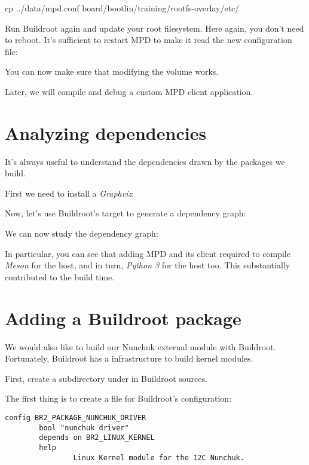\begin{bashinput}
cp ../data/mpd.conf board/bootlin/training/rootfs-overlay/etc/
\end{bashinput}

Run Buildroot again and update your root filesystem. Here again, you
don't need to reboot. It's sufficient to restart MPD to make it read
the new configuration file:


You can now make sure that modifying the volume works.

Later, we will compile and debug a custom MPD client application.

\section{Analyzing dependencies}

It's always useful to understand the dependencies drawn by the
packages we build.

First we need to install a {\em Graphviz}:


Now, let's use Buildroot's target to generate a
dependency graph:


We can now study the dependency graph:


In particular, you can see that adding MPD and its client
required to compile {\em Meson} for the host, and in turn,
{\em Python 3} for the host too. This substantially contributed to the
build time.

\section{Adding a Buildroot package}

We would also like to build our Nunchuk external module with Buildroot.
Fortunately, Buildroot has a  infrastructure
to build kernel modules.

First, create a  subdirectory under 
in Buildroot sources.

The first thing is to create a  file
for Buildroot's configuration:

\begin{verbatim}
config BR2_PACKAGE_NUNCHUK_DRIVER
        bool "nunchuk driver"
        depends on BR2_LINUX_KERNEL
        help
                Linux Kernel module for the I2C Nunchuk.
\end{verbatim}

